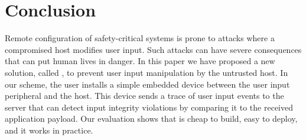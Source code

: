 
\section{Conclusion}
\label{sec:conclusion_IK}

Remote configuration of safety-critical systems is prone to attacks where a compromised host modifies user input. Such attacks can have severe consequences that can put human lives in danger. In this paper we have proposed a new solution, called \name, to prevent user input manipulation by the untrusted host. In our scheme, the user installs a simple embedded device between the user input peripheral and the host. This device sends a trace of user input events to the server that can detect input integrity violations by comparing it to the received application payload. Our evaluation shows that \name is cheap to build, easy to deploy, and it works in practice.


